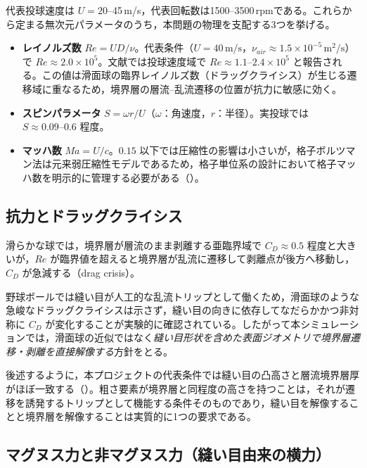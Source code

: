代表投球速度は \(U = 20\)--45\,m/s，代表回転数は1500--3500\,rpmである。これらから定まる無次元パラメータのうち，本問題の物理を支配する3つを挙げる。

\begin{itemize}
	\item \textbf{レイノルズ数} \(Re = UD/\nu\)。代表条件（\(U=40\,\text{m/s}\)，\(\nu_{air}\approx1.5\times10^{-5}\,\text{m}^2/\text{s}\)）で \(Re\approx2.0\times10^5\)。文献では投球速度域で \(Re\approx1.1\text{--}2.4\times10^5\) と報告される\cite{nathan2008,kensrud2010thesis}。この値は滑面球の臨界レイノルズ数（ドラッグクライシス）が生じる遷移域に重なるため，境界層の層流--乱流遷移の位置が抗力に敏感に効く。
	\item \textbf{スピンパラメータ} \(S = \omega r/U\)（\(\omega\)：角速度，\(r\)：半径）。実投球では \(S\approx0.09\text{--}0.6\) 程度。
	\item \textbf{マッハ数} \(Ma = U/c\)。\(0.15\) 以下では圧縮性の影響は小さいが，格子ボルツマン法は元来弱圧縮性モデルであるため，格子単位系の設計において格子マッハ数を明示的に管理する必要がある（）。
\end{itemize}

\subsection{抗力とドラッグクライシス}

滑らかな球では，境界層が層流のまま剥離する亜臨界域で \(C_D\approx0.5\) 程度と大きいが，\(Re\) が臨界値を超えると境界層が乱流に遷移して剥離点が後方へ移動し，\(C_D\) が急減する（drag crisis）。

野球ボールでは縫い目が人工的な乱流トリップとして働くため，滑面球のような急峻なドラッグクライシスは示さず，縫い目の向きに依存してなだらかかつ非対称に \(C_D\) が変化することが実験的に確認されている\cite{kensrud2010thesis,kensrud2017study}。したがって本シミュレーションでは，滑面球の近似ではなく\emph{縫い目形状を含めた表面ジオメトリで境界層遷移・剥離を直接解像する}方針をとる。

後述するように，本プロジェクトの代表条件では縫い目の凸高さと層流境界層厚がほぼ一致する（）。粗さ要素が境界層と同程度の高さを持つことは，それが遷移を誘発するトリップとして機能する条件そのものであり，縫い目を解像することと境界層を解像することは実質的に1つの要求である。

\subsection{マグヌス力と非マグヌス力（縫い目由来の横力）}
\label{sec:magnus}

